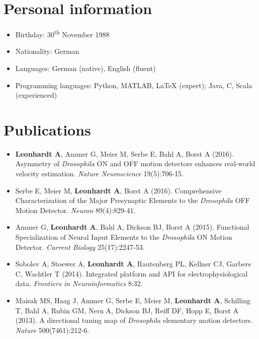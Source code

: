 \section*{Personal information}

\begin{itemize}
     \item Birthday: 30\textsuperscript{th} November 1988
     \item Nationality: German
     \item Languages: German (native), English (fluent)
     \item Programming languages: Python, MATLAB, LaTeX (expert); Java, C, Scala (experienced)
\end{itemize}

\section*{Publications}

\begin{itemize}
     
    \item \textbf{Leonhardt A}, Ammer G, Meier M, Serbe E, Bahl A, Borst A (2016). Asymmetry of \textit{Drosophila} ON and OFF motion detectors enhances real-world velocity estimation. \textit{Nature Neuroscience} 19(5):706-15.
    
    \item Serbe E, Meier M, \textbf{Leonhardt A}, Borst A (2016). Comprehensive Characterization of the Major Presynaptic Elements to the \textit{Drosophila} OFF Motion Detector. \textit{Neuron} 89(4):829-41.
        
    \item Ammer G, \textbf{Leonhardt A}, Bahl A, Dickson BJ, Borst A (2015). Functional Specialization of Neural Input Elements to the \textit{Drosophila} ON Motion Detector. \textit{Current Biology} 25(17):2247-53.
        
    \item Sobolev A, Stoewer A, \textbf{Leonhardt A}, Rautenberg PL, Kellner CJ, Garbers C, Wachtler T (2014). Integrated platform and API for electrophysiological data. \textit{Frontiers in Neuroinformatics} 8:32.
    
    \item Maisak MS, Haag J, Ammer G, Serbe E, Meier M, \textbf{Leonhardt A}, Schilling T, Bahl A, Rubin GM, Nern A, Dickson BJ, Reiff DF, Hopp E, Borst A (2013). A directional tuning map of \textit{Drosophila} elementary motion detectors. \textit{Nature} 500(7461):212-6.
    
\end{itemize}